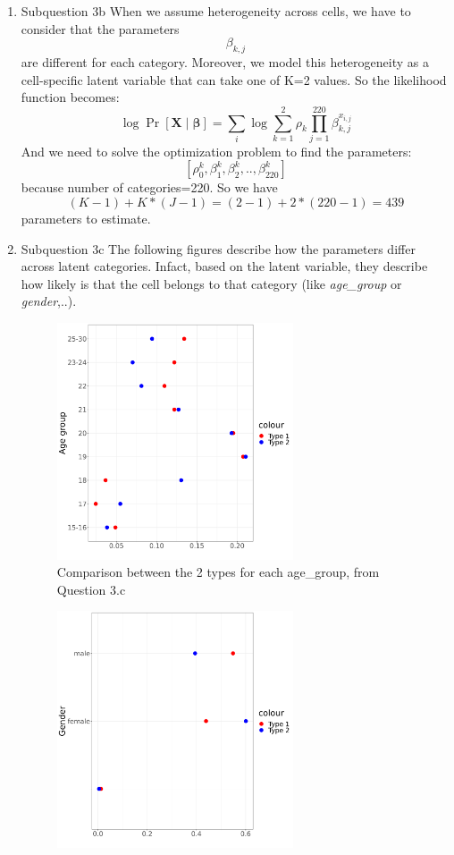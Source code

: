 \documentclass[12pt,twoside]{article}
\begin{document}
\begin{enumerate}
\begin{enumerate}
	\item Subquestion 3b 
	When we assume heterogeneity across cells, we have to consider that the parameters $$\beta_{k,j}$$ are different for each category. Moreover, we model this heterogeneity as a cell-specific latent variable that can take one of K=2 values.
	So the likelihood function becomes:
	\begin{equation}
		\log\operatorname{Pr}[\mathbf{X} \mid \boldsymbol{\beta}]=\sum_{i}\log\sum_{k=1}^{2} \rho_k \prod_{j=1}^{220} \beta_{k,j}^{x_{i,j}}
	\end{equation}
	And we need to solve the optimization problem to find the parameters: $$\left[\rho_0^k,\beta_1^k,\beta_2^k,..,\beta_220^k\right]$$
	because number of categories=220. So we have $$(K-1)+K*(J-1)=(2-1)+2*(220-1)=439$$ parameters to estimate.
	\item Subquestion 3c 
	The following figures describe how the parameters differ across latent categories. Infact, based on the latent variable, they describe how likely is that the cell belongs to that category (like \textit{age\_group} or \textit{gender},..).
	\begin{figure}[H]\centering
		\includegraphics[width=7cm]{age_group}
		\caption{Comparison between the 2 types for each age\_group, from Question 3.c}
		\label{fig:age_group}
	\end{figure}
	\begin{figure}[H]\centering
		\includegraphics[width=7cm]{Gender}

\end{figure}
\end{enumerate}
\end{enumerate}
\end{document}
